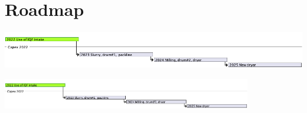 \documentclass[11pt]{article}
\author{Ricardo Antunes}
\date{\today}
\title{}
\begin{document}
\tableofcontents

\section{Roadmap}
\label{sec:orgb4d801c}


\begin{center}
\includegraphics[width=.9\linewidth]{Resources/roadmap.png}
\end{center}

\label{fig_roadmap}
\begin{center}
\includegraphics[height=50]{Resources/roadmap.png}
\end{center}
\end{document}
